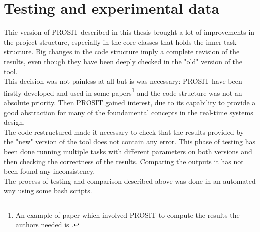\chapter{Testing and experimental data}\label{chp:experiments}


Thie version of PROSIT described in this thesis brought a lot of improvements in the project structure, especially in the core classes that holds the inner task structure. Big changes in the code structure imply a complete revision of the results, even though they have been deeply checked in the "old" version of the tool.\\
This decision was not painless at all but is was necessary: PROSIT have been firstly developed and used in some papers\footnote{An example of paper which involved PROSIT to compute the results the authors needed is \cite{probGuarantees}.} and the code structure was not an absolute priority. Then PROSIT gained interest, due to its capability to provide a good abstraction for many of the foundamental concepts in the real-time systems design.\\
The code restructured made it necessary to check that the results provided by the "new" version of the tool does not contain any error. This phase of testing has been done running multiple tasks with different parameters on both versions and then checking the correctness of the results. Comparing the outputs it has not been found any inconsistency.\\
The process of testing and comparison described above was done in an automated way using some bash scripts.

